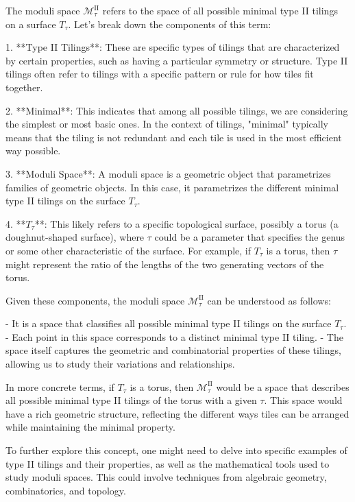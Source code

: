 The moduli space \(\mathcal{M}^{\text{II}}_{\tau}\) refers to the space of all possible minimal type II tilings on a surface \(T_{\tau}\). Let's break down the components of this term:

1. **Type II Tilings**: These are specific types of tilings that are characterized by certain properties, such as having a particular symmetry or structure. Type II tilings often refer to tilings with a specific pattern or rule for how tiles fit together.

2. **Minimal**: This indicates that among all possible tilings, we are considering the simplest or most basic ones. In the context of tilings, "minimal" typically means that the tiling is not redundant and each tile is used in the most efficient way possible.

3. **Moduli Space**: A moduli space is a geometric object that parametrizes families of geometric objects. In this case, it parametrizes the different minimal type II tilings on the surface \(T_{\tau}\).

4. **\(T_{\tau}\)**: This likely refers to a specific topological surface, possibly a torus (a doughnut-shaped surface), where \(\tau\) could be a parameter that specifies the genus or some other characteristic of the surface. For example, if \(T_{\tau}\) is a torus, then \(\tau\) might represent the ratio of the lengths of the two generating vectors of the torus.

Given these components, the moduli space \(\mathcal{M}^{\text{II}}_{\tau}\) can be understood as follows:

- It is a space that classifies all possible minimal type II tilings on the surface \(T_{\tau}\).
- Each point in this space corresponds to a distinct minimal type II tiling.
- The space itself captures the geometric and combinatorial properties of these tilings, allowing us to study their variations and relationships.

In more concrete terms, if \(T_{\tau}\) is a torus, then \(\mathcal{M}^{\text{II}}_{\tau}\) would be a space that describes all possible minimal type II tilings of the torus with a given \(\tau\). This space would have a rich geometric structure, reflecting the different ways tiles can be arranged while maintaining the minimal property.

To further explore this concept, one might need to delve into specific examples of type II tilings and their properties, as well as the mathematical tools used to study moduli spaces. This could involve techniques from algebraic geometry, combinatorics, and topology.